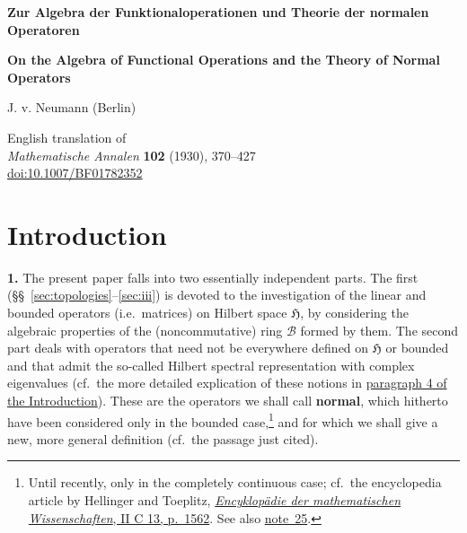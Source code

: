 \documentclass[
  paper=b5,
  twoside=true,
  fontsize=13pt,
  headings=normal,
  bookmarkpackage=false
]{scrartcl}
\theoremstyle{definition}
\newcommand{\NoteRef}[1]{\hyperref[fn:#1]{note~#1}}
\begin{document}
\begin{titlepage}
  \setcounter{page}{1}
  \centering
  \vspace*{0.10\textheight}
  {\Large\bfseries
   Zur Algebra der Funktionaloperationen
   und Theorie der normalen Operatoren\par}
  \vspace{1.4em}
  {\large\bfseries
   On the Algebra of Functional Operations
   and the Theory of Normal Operators\par}
  \vspace{2.2em}
  {\large J. v. Neumann (Berlin)\par}
  \vfill
  {\normalsize
   English translation of\\
   \textit{Mathematische Annalen} \textbf{102} (1930), 370--427\\[0.5em]
   \href{https://doi.org/10.1007/BF01782352}{doi:10.1007/BF01782352}\par}
  \vspace*{0.10\textheight}
  \thispagestyle{empty}
\end{titlepage}
\setcounter{page}{2}

\tableofcontents
\clearpage

\section*{Introduction}\label{sec:introduction}

\noindent\textbf{1.}\label{intro:1}
The present paper falls into two essentially independent parts. The first
(\S\S~\ref{sec:topologies}--\ref{sec:iii}) is devoted to the investigation of the linear and bounded
operators (i.e.\ matrices) on Hilbert space $\mathfrak H$, by considering the
algebraic properties of the (noncommutative) ring $\mathcal B$ formed by
them. The second part deals with operators that need not be everywhere defined
on $\mathfrak H$ or bounded and that admit the so-called Hilbert spectral representation with
complex eigenvalues (cf.\ the more detailed explication of these notions in
\hyperref[intro:4]{paragraph 4 of the Introduction}). These are the operators we shall call \textbf{normal}, which hitherto have been considered only in
the bounded case,\footnote{\label{fn:1}Until recently, only in the completely continuous
case; cf.\ the encyclopedia article by Hellinger and Toeplitz,
\href{https://doi.org/10.1007/978-3-663-15917-9}{\emph{Encyklop\"adie der mathematischen Wissenschaften}, II C 13, p.~1562}.
See also \NoteRef{25}.} and for which we shall give a
new, more general definition (cf.\ the passage just cited).
\end{document}
